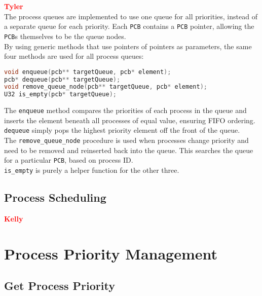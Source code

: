 \documentclass[12pt]{report}
\begin{document}
\textcolor{red}{\textbf{Tyler}} \\
The process queues are implemented to use one queue for all priorities, instead of a separate queue for each priority. Each {\tt PCB} contains a {\tt PCB} pointer, allowing the {\tt PCB}s themselves to be the queue nodes. \\
By using generic methods that use pointers of pointers as parameters, the same four methods are used for all process queues: \\
\begin{minipage}{\textwidth}
\begin{lstlisting}[language=C, frame=single]
void enqueue(pcb** targetQueue, pcb* element);
pcb* dequeue(pcb** targetQueue);
void remove_queue_node(pcb** targetQueue, pcb* element);
U32 is_empty(pcb* targetQueue);
\end{lstlisting}
\end{minipage}
The {\tt enqueue} method compares the priorities of each process in the queue and inserts the element beneath all processes of equal value, ensuring FIFO ordering.\\
{\tt dequeue} simply pops the highest priority element off the front of the queue.\\
The {\tt remove_queue_node} procedure is used when processes change priority and need to be removed and reinserted back into the queue. This searches the queue for a particular {\tt PCB}, based on process ID.\\
{\tt is_empty} is purely a helper function for the other three.\\

\subsection{Process Scheduling}


\textcolor{red}{\textbf{Kelly}} \\



\section{Process Priority Management}

\subsection{Get Process Priority}
\end{document}
